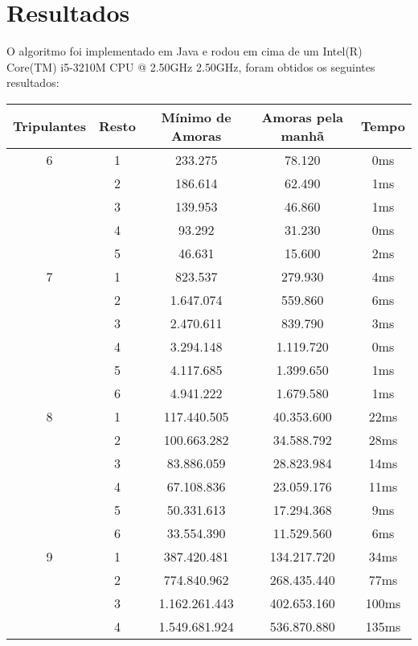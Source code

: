 \documentclass[12pt]{article}
\begin{document}
\section{Resultados}

O algoritmo foi implementado em Java e rodou em cima de um Intel(R) Core(TM) i5-3210M CPU @ 2.50GHz 2.50GHz, foram obtidos os seguintes resultados:

\begin{table}[H]

\centering

\begin{tabular}{|c|c|c|c|c|}

\hline
Tripulantes & Resto & Mínimo de Amoras & Amoras pela manhã & Tempo \\
\hline
6 & 1 & 233.275 & 78.120 & 0ms \\
\cline{2-5}
& 2 & 186.614 & 62.490 & 1ms\\
\cline{2-5}
& 3 & 139.953 & 46.860 & 1ms \\
\cline{2-5}
& 4 & 93.292 & 31.230 & 0ms \\
\cline{2-5}
& 5 & 46.631 & 15.600 & 2ms \\
\hline
7 & 1 & 823.537 & 279.930 & 4ms \\
\cline{2-5}
& 2 & 1.647.074 & 559.860 & 6ms \\
\cline{2-5}
& 3 & 2.470.611 & 839.790 & 3ms \\
\cline{2-5}
& 4 & 3.294.148 & 1.119.720 & 0ms \\
\cline{2-5}
& 5 & 4.117.685 & 1.399.650 & 1ms \\
\cline{2-5}
& 6 & 4.941.222 & 1.679.580 & 1ms \\
\hline
8 & 1 & 117.440.505 & 40.353.600 & 22ms \\
\cline{2-5}
& 2 & 100.663.282 & 34.588.792 & 28ms \\
\cline{2-5}
& 3 & 83.886.059 & 28.823.984 & 14ms \\
\cline{2-5}
& 4 & 67.108.836 & 23.059.176 & 11ms \\
\cline{2-5}
& 5 & 50.331.613 & 17.294.368 & 9ms \\
\cline{2-5}
& 6 & 33.554.390 & 11.529.560 & 6ms \\
\hline
9 & 1 & 387.420.481 & 134.217.720 & 34ms \\
\cline{2-5}
& 2 & 774.840.962 & 268.435.440 & 77ms \\
\cline{2-5}
& 3 & 1.162.261.443 & 402.653.160 & 100ms \\
\cline{2-5}
& 4 & 1.549.681.924 & 536.870.880 & 135ms \\

\end{tabular}
\end{table}
\end{document}
